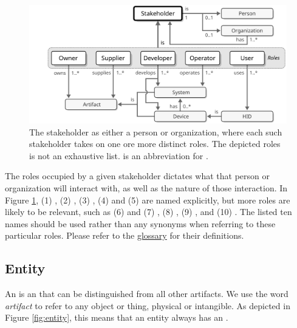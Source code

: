 \vspace*{0.3cm}

\begin{figure}[ht!]
  \centering
  \includegraphics[scale=0.9]{figures/stakeholder}
  \caption{
    The stakeholder as either a person or organization, where each such stakeholder takes on one ore more distinct roles.
    The depicted roles is not an exhaustive list.
     is an abbreviation for .
  }
  \label{fig:stakeholder}
\end{figure}

\vspace*{0.1cm}

The roles occupied by a given stakeholder dictates what  that person or organization will interact with, as well as the nature of those interaction.
In Figure \ref{fig:stakeholder}, (1) , (2) , (3) , (4)  and (5)  are named explicitly, but more roles are likely to be relevant, such as (6)  and (7) , (8) , (9) , and (10) .
The listed ten names should be used rather than any synonyms when referring to these particular roles.
Please refer to the \hyperref[sec:glossary]{glossary} for their definitions.

\subsection{Entity}
\label{sec:reference-model:entity}

An  is an  that can be distinguished from all other artifacts.
We use the word \textit{artifact} to refer to any object or thing, physical or intangible.
As depicted in Figure \ref{fig:entity}, this means that an entity always has an .

